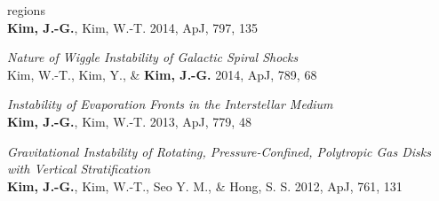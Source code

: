\begin{benumerate}{22}
{regions}\\ \textbf{Kim, J.-G.}, Kim, W.-T. 2014, ApJ, 797, 135
\item \textit{Nature of Wiggle Instability of Galactic Spiral Shocks}\\ Kim,
W.-T., Kim, Y., \& \textbf{Kim, J.-G.} 2014, ApJ, 789, 68
\item \textit{Instability of Evaporation Fronts in the Interstellar Medium}\\
  \textbf{Kim, J.-G.}, Kim, W.-T. 2013, ApJ, 779, 48
\item \textit{Gravitational Instability of Rotating, Pressure-Confined,
    Polytropic Gas Disks with Vertical Stratification} \\ \textbf{Kim, J.-G.},
  Kim, W.-T., Seo Y. M., \& Hong, S. S. 2012, ApJ, 761, 131
\end{benumerate}

